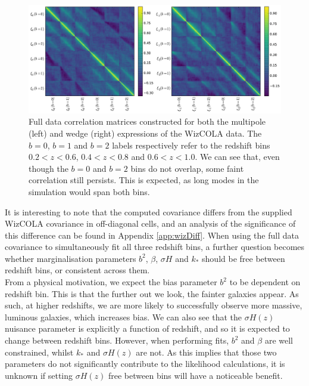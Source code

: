 \documentclass[titlesmallcaps, examinerscopy, copyrightpage]{uqthesis}
\begin{document}
\begin{figure}[h!]
  \begin{center}
    \includegraphics[width=\textwidth]{images/fullCorrelations.pdf}
  \end{center}
  \caption{Full data correlation matrices constructed for both the multipole (left) and wedge (right) expressions of the WizCOLA data. The $b=0$, $b=1$ and $b=2$ labels respectively refer to the redshift bins $0.2 < z < 0.6$, $0.4 < z < 0.8$ and $0.6 < z < 1.0$. We can see that, even though the $b=0$ and $b=2$ bins do not overlap, some faint correlation still persists. This is expected, as long modes in the simulation would span both bins.}
  \label{fig:fullCorrelations}
\end{figure}




It is interesting to note that the computed covariance differs from the supplied WizCOLA covariance in off-diagonal cells, and an analysis of the significance of this difference can be found in Appendix \ref{app:wizDiff}. When using the full data covariance to simultaneously fit all three redshift bins, a further question becomes whether marginalisation parameters $b^2$, $\beta$, $\sigma H$ and $k_*$ should be free between redshift bins, or consistent across them. \\

From a physical motivation, we expect the bias parameter $b^2$ to be dependent on redshift bin. This is that the further out we look, the fainter galaxies appear. As such, at higher redshifts, we are more likely to successfully observe more massive, luminous galaxies, which increases bias. We can also see that the $\sigma H(z)$ nuisance parameter is explicitly a function of redshift, and so it is expected to change between redshift bins. However, when performing fits, $b^2$ and $\beta$ are well constrained, whilst $k_*$ and $\sigma H(z)$ are not. As this implies that those two parameters do not significantly contribute to the likelihood calculations, it is unknown if setting $\sigma H(z)$ free between bins will have a noticeable benefit. \\
\end{document}
